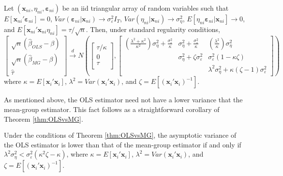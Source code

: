 \begin{thm}
\label{thm:OLSvsMG}
Let $\left( \mathbf{x}_{ni},\eta_{ni}, \boldsymbol{\varepsilon}_{ni} \right)$ be an iid triangular array of random variables such that $E[\mathbf{x}_{ni}'\boldsymbol{\varepsilon}_{ni}] =0$, $Var(\boldsymbol{\varepsilon}_{ni}|\mathbf{x}_{ni}) \rightarrow \sigma_{\varepsilon}^2 I_T$, $Var(\eta_{ni}|\mathbf{x}_{ni}) \rightarrow \sigma_{\eta}^2$, $E[\eta_{ni} \boldsymbol{\varepsilon}_{ni}|\mathbf{x}_{ni}] \rightarrow 0$, and $E[\mathbf{x}_{ni}'\mathbf{x}_{ni}\eta_{ni}] = \tau/\sqrt{n}$.
Then, under standard regularity conditions, 
\[
  \left[\begin{array}{c}
\sqrt{n} (\widehat{\beta}_{OLS} - \beta)\\
\sqrt{n} (\widehat{\beta}_{MG} - \beta)\\
\widehat{\tau}
\end{array}\right] \overset{d}{\rightarrow} N \left( 
\left[\begin{array}{c}
\tau/\kappa \\
0  \\
\tau\\
\end{array}\right],  
\left[
\begin{array}{ccc}
  \displaystyle\left(\frac{\lambda^2 + \kappa^2}{\kappa^2}\right)\sigma_\eta^2 + \frac{\sigma_\varepsilon^2}{\kappa} & \displaystyle \sigma_\eta^2 + \frac{\sigma_\varepsilon^2}{\kappa} &\displaystyle\left(\frac{\lambda^2}{\kappa}\right)\sigma_\eta^2  \\
  & \sigma_{\eta}^2 + \zeta \sigma_\varepsilon^2 & \sigma_{\varepsilon}^2 (1 - \kappa\zeta) \\
   &  & \lambda^2 \sigma_\eta^2 + \kappa(\zeta - 1) \sigma_\varepsilon^2 
\end{array}
\right]\right)
\]
where $\kappa = E[\mathbf{x}_i' \mathbf{x}_i]$, $\lambda^2 = Var\left( \mathbf{x}_i'\mathbf{x}_i \right)$, and $\zeta = E\left[ \left( \mathbf{x}_i' \mathbf{x}_i \right)^{-1} \right]$.  
\end{thm}

As mentioned above, the OLS estimator need not have a lower variance that the mean-group estimator.
This fact follows as a straightforward corollary of Theorem \ref{thm:OLSvsMG}.

\begin{cor}
  Under the conditions of Theorem \ref{thm:OLSvsMG}, the asymptotic variance of the OLS estimator is lower than that of the mean-group estimator if and only if $\lambda^2\sigma_\eta^2 < \sigma_\varepsilon^2(\kappa^2\zeta - \kappa)$, 
where $\kappa = E[\mathbf{x}_i' \mathbf{x}_i]$, $\lambda^2 = Var\left( \mathbf{x}_i'\mathbf{x}_i \right)$, and $\zeta = E\left[ \left( \mathbf{x}_i' \mathbf{x}_i \right)^{-1} \right]$.  
\end{cor}

